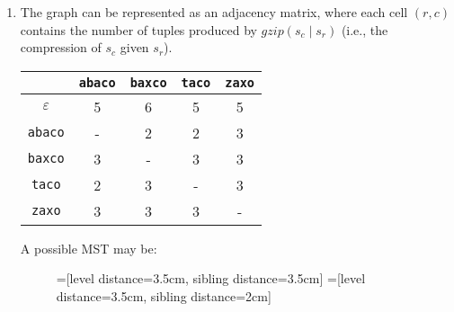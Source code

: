 \begin{enumerate}
  \item The graph can be represented as an adjacency matrix, where each cell
  $(r, c)$ contains the number of tuples produced by $gzip(s_c \mid s_r)$ (i.e.,
  the compression of $s_c$ given $s_r$).
  \begin{table}[H]
    \centering
    \begin{tabular}{c|c|c|c|c|}
      & {\tt abaco} & {\tt baxco} & {\tt taco} & {\tt zaxo} \\ \hline
      $\varepsilon$ & 5 & 6 & 5 & 5 \\ \hline
      {\tt abaco} & - & 2 & 2 & 3 \\ \hline
      {\tt baxco} & 3 & - & 3 & 3 \\ \hline
      {\tt taco} & 2 & 3 & - & 3 \\ \hline
      {\tt zaxo} & 3 & 3 & 3 & - \\ \hline
    \end{tabular}
  \end{table}
  A possible MST may be:
  \begin{figure}[H]
    \centering
    =[level distance=3.5cm, sibling distance=3.5cm]
    =[level distance=3.5cm, sibling distance=2cm]
  \end{figure}

\end{enumerate}
